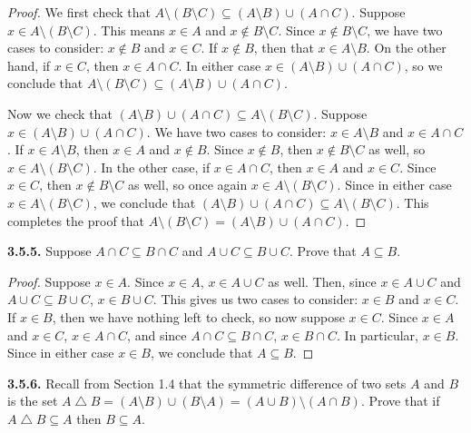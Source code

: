 \documentclass[12pt]{amsart}
\newenvironment{statement}[1]{\smallskip\noindent\color[rgb]{.6627, .3529, .6314} {\bf #1.}}{}
\theoremstyle{definition}
\theoremstyle{remark}
\begin{document}
\begin{proof}
We first check that $A \setminus (B \setminus C) \subseteq (A \setminus B) \cup (A \cap C)$.
Suppose $x \in A \setminus (B \setminus C)$.
This means $x \in A$ and $x \notin B \setminus C$.
Since $x \notin B \setminus C$, we have two cases to consider: $x \notin B$ and $x \in C$.
If $x \notin B$, then that $x \in A \setminus B$.
On the other hand, if $x \in C$, then $x \in A \cap C$.
In either case $x \in (A \setminus B) \cup (A \cap C)$, so we conclude that $A \setminus (B \setminus C) \subseteq (A \setminus B) \cup (A \cap C)$.

Now we check that $(A \setminus B) \cup (A \cap C) \subseteq A \setminus (B \setminus C)$.
Suppose $x \in (A \setminus B) \cup (A \cap C)$.
We have two cases to consider: $x \in A \setminus B$ and $x \in A \cap C$.
If $x \in A \setminus B$, then $x \in A$ and $x \notin B$.
Since $x \notin B$, then $x \notin B \setminus C$ as well, so $x \in A \setminus (B \setminus C)$.
In the other case, if $x \in A \cap C$, then $x \in A$ and $x \in C$.
Since $x \in C$, then $x \notin B \setminus C$ as well, so once again $x \in A \setminus (B \setminus C)$.
Since in either case $x \in A \setminus (B \setminus C)$, we conclude that $(A \setminus B) \cup (A \cap C) \subseteq A \setminus (B \setminus C)$.
This completes the proof that $A \setminus (B \setminus C) = (A \setminus B) \cup (A \cap C)$.
\end{proof}


\begin{statement}{3.5.5}
Suppose $A \cap C \subseteq B \cap C$ and $A \cup C \subseteq B \cup C$.
Prove that $A \subseteq B$.
\end{statement}

\begin{proof}
Suppose $x \in A$.
Since $x \in A$, $x \in A \cup C$ as well.
Then, since $x \in A \cup C$ and $A \cup C \subseteq B \cup C$, $x \in B \cup C$.
This gives us two cases to consider: $x \in B$ and $x \in C$.
If $x \in B$, then we have nothing left to check, so now suppose $x \in C$.
Since $x \in A$ and $x \in C$, $x \in A \cap C$, and since $A \cap C \subseteq B \cap C$, $x \in B \cap C$.
In particular, $x \in B$.
Since in either case $x \in B$, we conclude that $A \subseteq B$.
\end{proof}


\begin{statement}{3.5.6}
Recall from Section 1.4 that the symmetric difference of two sets $A$ and $B$ is the set $A \bigtriangleup B = (A \setminus B) \cup (B \setminus A) = (A \cup B) \setminus (A \cap B)$.
Prove that if $A \bigtriangleup B \subseteq A$ then $B \subseteq A$.
\end{statement}
\end{document}
